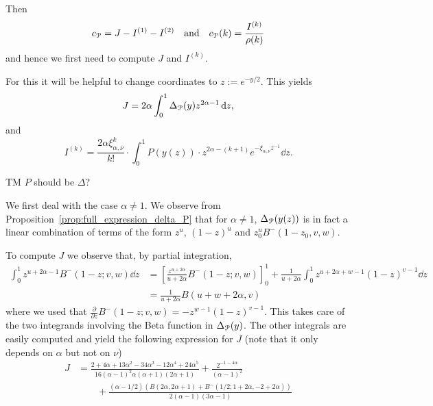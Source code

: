 Then
\[   
	c_{{\mathcal P}} = J - I^{(1)} - I^{(2)} \quad \text{and} \quad
	c_{{\mathcal P}}(k) = \frac{I^{(k)}}{\rho(k)}
\]
and hence we first need to compute $J$ and $I^{(k)}$.

For this it will be helpful to change coordinates to $z := e^{-y/2}$. This yields 
\[ 
	J = 2 \alpha \int_0^1 \Delta_{{\mathcal P}}(y) z^{2\alpha-1} \operatorname{\mathrm{d}\hspace{-2pt}} z, 
\]
and 
\[ 
	I^{(k)} = \frac{2 \alpha \xi_{\alpha,\nu}^k}{k!} \cdot \int_0^1 P(y(z)) \cdot z^{2\alpha-(k+1)} e^{-\xi_{\alpha,\nu} z^{-1}} \dd z. 
\]


TM{ $P$ should be $\Delta$? }

We first deal with the case $\alpha \not = 1$. We observe from Proposition~\ref{prop:full_expression_delta_P} that for $\alpha \not =1$, $\Delta_{{\mathcal P}}(y(z))$ is in fact a linear combination of terms of the form $z^u$, $(1-z)^u$ and $z_0^u B^-(1-z_0,v,w)$.

To compute $J$ we observe that, by partial integration, 
\begin{align*}
	\int_0^1 z^{u+2\alpha-1} B^-(1-z;v,w) \dd z 
	&= \left[ \frac{z^{u+2\alpha}}{u+2\alpha} B^-(1-z;v,w) \right]_0^1 
		+ \frac{1}{u+2\alpha} \int_0^1 z^{u+2\alpha+w-1} (1-z)^{v-1} \dd z \\
	&= \frac{1}{u+2\alpha} B(u+w+2\alpha,v)
\end{align*}
where we used that $\frac{\partial}{\partial z} B^-(1-z;v,w) = - z^{w-1} (1-z)^{v-1}$. This takes care of the two integrands involving the Beta function in $\Delta_{{\mathcal P}}(y)$. The other integrals are easily computed and yield the following expression for $J$ (note that it only depends on $\alpha$ but not on $\nu$)
\begin{align*}
J&=\frac{2 + 4 \alpha + 13 \alpha^2 - 34 \alpha^3 - 12\alpha^4 + 
	24 \alpha^5}{16(\alpha-1)^2 \alpha (\alpha+1) (2\alpha+1)} +  \frac{2^{-1 - 
		4 \alpha}}{(\alpha - 1)^2} \\
	&\qquad+ \frac{(\alpha - 1/2) (B(2 \alpha, 2 \alpha + 1) + 
	B^-(1/2; 1 + 2 \alpha, -2 + 2 \alpha))}{2 (\alpha - 1) (3 \alpha - 1)}
\end{align*}


